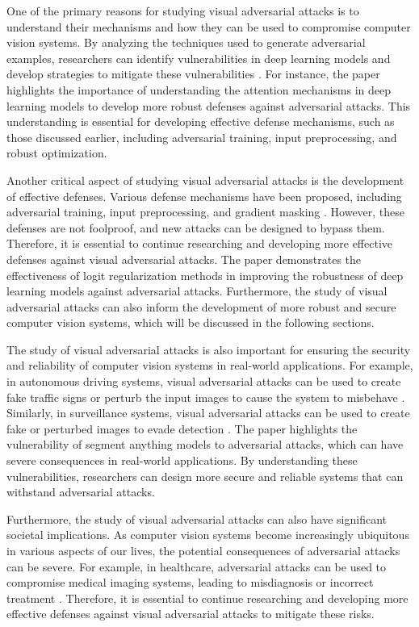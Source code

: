 \documentclass[11pt]{article}
\begin{document}
One of the primary reasons for studying visual adversarial attacks is to understand their mechanisms and how they can be used to compromise computer vision systems. By analyzing the techniques used to generate adversarial examples, researchers can identify vulnerabilities in deep learning models and develop strategies to mitigate these vulnerabilities \cite{ref8}. For instance, the \cite{ref13} paper highlights the importance of understanding the attention mechanisms in deep learning models to develop more robust defenses against adversarial attacks. This understanding is essential for developing effective defense mechanisms, such as those discussed earlier, including adversarial training, input preprocessing, and robust optimization.

Another critical aspect of studying visual adversarial attacks is the development of effective defenses. Various defense mechanisms have been proposed, including adversarial training, input preprocessing, and gradient masking \cite{ref9}. However, these defenses are not foolproof, and new attacks can be designed to bypass them. Therefore, it is essential to continue researching and developing more effective defenses against visual adversarial attacks. The \cite{ref14} paper demonstrates the effectiveness of logit regularization methods in improving the robustness of deep learning models against adversarial attacks. Furthermore, the study of visual adversarial attacks can also inform the development of more robust and secure computer vision systems, which will be discussed in the following sections.

The study of visual adversarial attacks is also important for ensuring the security and reliability of computer vision systems in real-world applications. For example, in autonomous driving systems, visual adversarial attacks can be used to create fake traffic signs or perturb the input images to cause the system to misbehave \cite{ref7}. Similarly, in surveillance systems, visual adversarial attacks can be used to create fake or perturbed images to evade detection \cite{ref15}. The \cite{ref16} paper highlights the vulnerability of segment anything models to adversarial attacks, which can have severe consequences in real-world applications. By understanding these vulnerabilities, researchers can design more secure and reliable systems that can withstand adversarial attacks.

Furthermore, the study of visual adversarial attacks can also have significant societal implications. As computer vision systems become increasingly ubiquitous in various aspects of our lives, the potential consequences of adversarial attacks can be severe. For example, in healthcare, adversarial attacks can be used to compromise medical imaging systems, leading to misdiagnosis or incorrect treatment \cite{ref17}. Therefore, it is essential to continue researching and developing more effective defenses against visual adversarial attacks to mitigate these risks.
\end{document}

